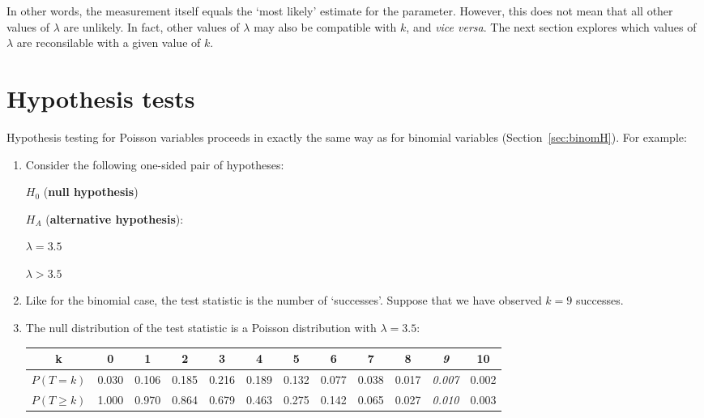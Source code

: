 In other words, the measurement itself equals the `most likely'
estimate for the parameter. However, this does not mean that all other
values of $\lambda$ are unlikely. In fact, other values of $\lambda$
may also be compatible with $k$, and \emph{vice versa}. The next
section explores which values of $\lambda$ are reconsilable with a
given value of $k$.

\section{Hypothesis tests}
\label{sec:poishyp}

Hypothesis testing for Poisson variables proceeds in exactly the same
way as for binomial variables (Section~\ref{sec:binomH}). For example:

\begin{enumerate}
\item Consider the following one-sided pair of hypotheses:

  \noindent\begin{minipage}{.4\textwidth}
    $H_0$ (\textbf{null hypothesis})
    
    \vspace{1em}
    
    $H_{\!A}$ (\textbf{alternative hypothesis}):
  \end{minipage}
  \begin{minipage}{.2\textwidth}
  \end{minipage}
  \begin{minipage}{.2\textwidth}
    $\lambda = 3.5$
    
    \vspace{1em}
    
    $\lambda>{3.5}$
  \end{minipage}
  \begin{minipage}{.2\textwidth}
  \end{minipage}\medskip

\item Like for the binomial case, the test statistic is the number of
  `successes'.  Suppose that we have observed $k=9$ successes.

\item The null distribution of the test statistic is a Poisson
  distribution with $\lambda={3.5}$:
  
  \begin{tabular}{c@{~}c@{~}c@{~}c@{~}c@{~}c@{~}c@{~}c@{~}c@{~}c@{~}c@{~}c}
    k & 0 & 1 & 2 & 3 & 4 & 5 & 6 & 7 & 8 & \textit{9} & 10 \\ \hline
    $P(T=k)$ & 0.030 & 0.106 & 0.185 & 0.216 & 0.189 &
    0.132 & 0.077 & 0.038 & 0.017 & \textit{0.007} & 0.002 \\
    $P({T}\geq{k})$ & 1.000 & 0.970 & 0.864 & 0.679 & 0.463 &
    0.275 & 0.142 & 0.065 & 0.027 & \textit{0.010} & 0.003 \\
  \end{tabular}


\end{enumerate}
